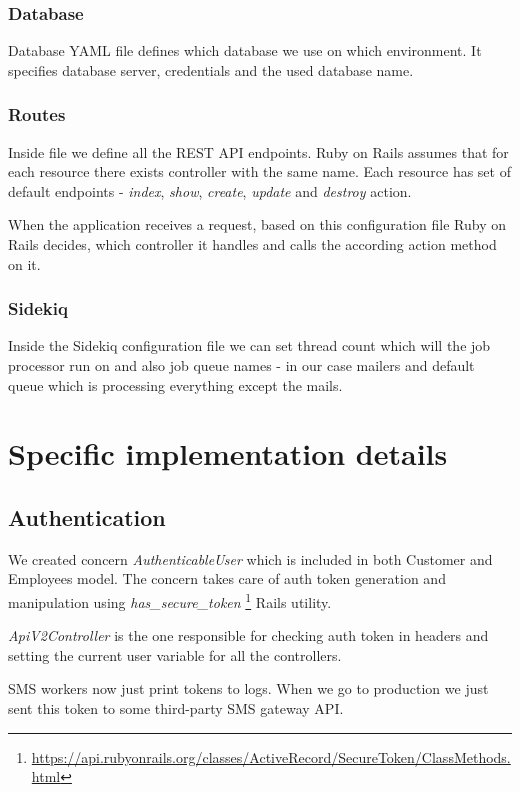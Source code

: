 		\subsubsection{Database}
			Database YAML file defines which database we use on which environment. It specifies database server, credentials and the used database name.
		\subsubsection{Routes}
			Inside  file we define all the REST API endpoints. Ruby on Rails assumes that for each resource there exists controller with the same name. Each resource has set of default endpoints - \textit{index}, \textit{show}, \textit{create}, \textit{update} and \textit{destroy} action. 
			
			When the application receives a request, based on this configuration file Ruby on Rails decides, which controller it handles and calls the according action method on it.
		\subsubsection{Sidekiq}
			Inside the Sidekiq configuration file we can set thread count which will the job processor run on and also job queue names - in our case mailers and default queue which is processing everything except the mails.
		
		
\section {Specific implementation details}
	\subsection {Authentication}
		We created concern \textit{AuthenticableUser} which is included in both Customer and Employees model. The concern takes care of auth token generation and manipulation using \textit{has\_secure\_token} \footnote{\url{https://api.rubyonrails.org/classes/ActiveRecord/SecureToken/ClassMethods.html}} Rails utility. 
		
		\textit{ApiV2Controller} is the one responsible for checking auth token in headers and setting the current user variable for all the controllers.
		
		SMS workers now just print tokens to logs. When we go to production we just sent this token to some third-party SMS gateway API.
		
